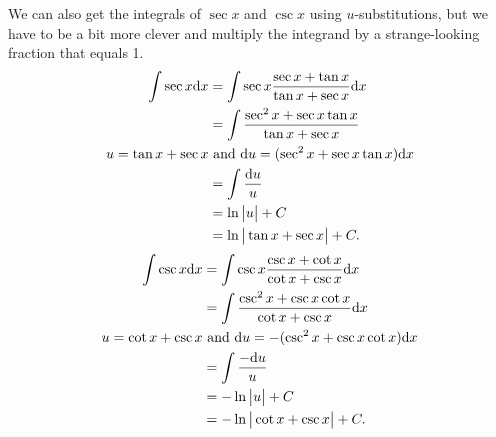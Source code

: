 We can also get the integrals of $\sec{x}$ and $\csc{x}$ using $u$-substitutions, but we have to be a bit more clever and multiply the integrand by a strange-looking fraction that equals 1.
\begin{align*}
	\int{\sec{x}\mathrm{d} x} &= \int{\sec{x}\frac{\sec{x} + \tan{x}}{\tan{x}+\sec{x}}\mathrm{d} x} \\
	&= \int{\frac{\sec^2{x}+\sec{x}\tan{x}}{\tan{x}+\sec{x}}} \\
	u = \tan{x} + \sec{x} &\text{ and } \mathrm{d} u = (\sec^2{x} + \sec{x}\tan{x})\mathrm{d} x \\
	&= \int{\frac{\mathrm{d} u}{u}} \\
	&= \ln{\big\lvert u \big\rvert} + C \\
	&= \ln{\big\lvert \tan{x} + \sec{x} \big\rvert} + C.
\end{align*}
\begin{align*}
	\int{\csc{x}\mathrm{d} x} &= \int{\csc{x}\frac{\csc{x}+\cot{x}}{\cot{x}+\csc{x}}\mathrm{d} x} \\
	&= \int{\frac{\csc^2{x}+\csc{x}\cot{x}}{\cot{x}+\csc{x}}\mathrm{d} x} \\
	u = \cot{x} + \csc{x} &\text{ and } \mathrm{d} u = -(\csc^2{x}+\csc{x}\cot{x})\mathrm{d} x \\
	&= \int{\frac{-\mathrm{d} u}{u}} \\
	&= -\ln{\big\lvert u \big\rvert} + C \\
	&= -\ln{\big\lvert \cot{x}+\csc{x} \big\rvert} + C.
\end{align*}